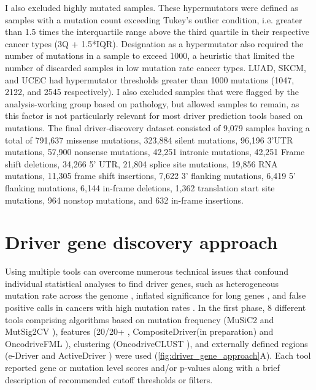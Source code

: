 I also excluded highly mutated samples. These hypermutators were defined as samples with a mutation count exceeding Tukey's outlier condition, i.e. greater than 1.5 times the interquartile range above the third quartile in their respective cancer types (3Q + 1.5*IQR). Designation as a hypermutator also required the number of mutations in a sample to exceed 1000, a heuristic that limited the number of discarded samples in low mutation rate cancer types. LUAD, SKCM, and UCEC had hypermutator thresholds greater than 1000 mutations (1047, 2122, and 2545 respectively). I also excluded samples that were flagged by the analysis-working group based on pathology, but allowed  samples to remain, as this factor is not particularly relevant for most driver prediction tools based on mutations. The final driver-discovery dataset consisted of 9,079 samples having a total of 791,637 missense mutations, 323,884 silent mutations, 96,196 3'UTR mutations, 57,900 nonsense mutations, 42,251 intronic mutations, 42,251 Frame shift deletions, 34,266 5' UTR, 21,804 splice site mutations, 19,856 RNA mutations, 11,305 frame shift insertions, 7,622 3' flanking mutations, 6,419 5' flanking mutations, 6,144 in-frame deletions, 1,362 translation start site mutations, 964 nonstop mutations, and 632 in-frame insertions.

\section{Driver gene discovery approach}
Using multiple tools can overcome numerous technical issues that confound individual statistical analyses to find driver genes, such as heterogeneous mutation rate across the genome \cite{RN13}, inflated significance for long genes \cite{RN169}, and false positive calls in cancers with high mutation rates \cite{RN70}. In the first phase, 8 different tools comprising algorithms based on mutation frequency (MuSiC2 \cite{RN43} and MutSig2CV \cite{RN14}), features (20/20+ \cite{RN70}, CompositeDriver(in preparation) and OncodriveFML \cite{RN86}), clustering (OncodriveCLUST \cite{RN54}), and externally defined regions (e-Driver \cite{RN153} and ActiveDriver \cite{RN98}) were used (\autoref{fig:driver_gene_approach}A). Each tool reported gene or mutation level scores and/or p-values along with a brief description of recommended cutoff thresholds or filters.

